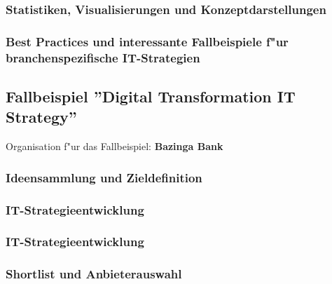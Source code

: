 \documentclass[a4paper, 12pt]{article} %
\begin{document}
\subsubsection{Statistiken, Visualisierungen und Konzeptdarstellungen}


\subsubsection{Best Practices und interessante Fallbeispiele f"ur branchenspezifische IT-Strategien}


\newpage
\subsection{Fallbeispiel ''Digital Transformation IT Strategy''}
\label{subsec:Fallbeispiel}
Organisation f"ur das Fallbeispiel: \textbf{Bazinga Bank}

\subsubsection{Ideensammlung und Zieldefinition}


\subsubsection{IT-Strategieentwicklung}




\subsubsection{IT-Strategieentwicklung}



\subsubsection{Shortlist und Anbieterauswahl}









\end{document}
